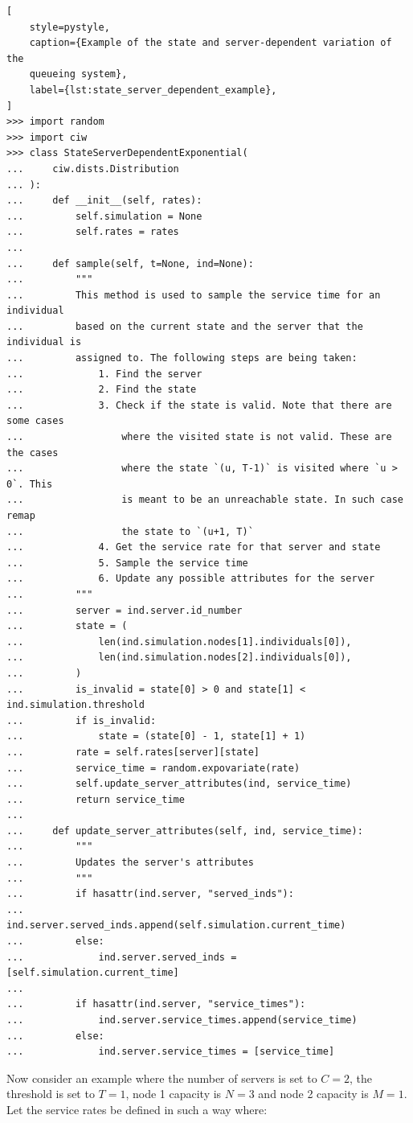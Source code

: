 \begin{lstlisting}[
    style=pystyle,
    caption={Example of the state and server-dependent variation of the
    queueing system},
    label={lst:state_server_dependent_example},
]
>>> import random
>>> import ciw
>>> class StateServerDependentExponential(
...     ciw.dists.Distribution
... ):
...     def __init__(self, rates):
...         self.simulation = None
...         self.rates = rates
... 
...     def sample(self, t=None, ind=None):
...         """
...         This method is used to sample the service time for an individual
...         based on the current state and the server that the individual is
...         assigned to. The following steps are being taken:
...             1. Find the server
...             2. Find the state
...             3. Check if the state is valid. Note that there are some cases
...                 where the visited state is not valid. These are the cases
...                 where the state `(u, T-1)` is visited where `u > 0`. This
...                 is meant to be an unreachable state. In such case remap
...                 the state to `(u+1, T)`
...             4. Get the service rate for that server and state
...             5. Sample the service time
...             6. Update any possible attributes for the server
...         """
...         server = ind.server.id_number
...         state = (
...             len(ind.simulation.nodes[1].individuals[0]),
...             len(ind.simulation.nodes[2].individuals[0]),
...         )
...         is_invalid = state[0] > 0 and state[1] < ind.simulation.threshold
...         if is_invalid:
...             state = (state[0] - 1, state[1] + 1)
...         rate = self.rates[server][state]
...         service_time = random.expovariate(rate)
...         self.update_server_attributes(ind, service_time)
...         return service_time
... 
...     def update_server_attributes(self, ind, service_time):
...         """
...         Updates the server's attributes
...         """
...         if hasattr(ind.server, "served_inds"):
...             ind.server.served_inds.append(self.simulation.current_time)
...         else:
...             ind.server.served_inds = [self.simulation.current_time]
... 
...         if hasattr(ind.server, "service_times"):
...             ind.server.service_times.append(service_time)
...         else:
...             ind.server.service_times = [service_time]

\end{lstlisting}

Now consider an example where the number of servers is set to \(C = 2\), the
threshold is set to \(T = 1\), node 1 capacity is \(N = 3\) and node 2 capacity
is \(M = 1\).
Let the service rates be defined in such a way where:

